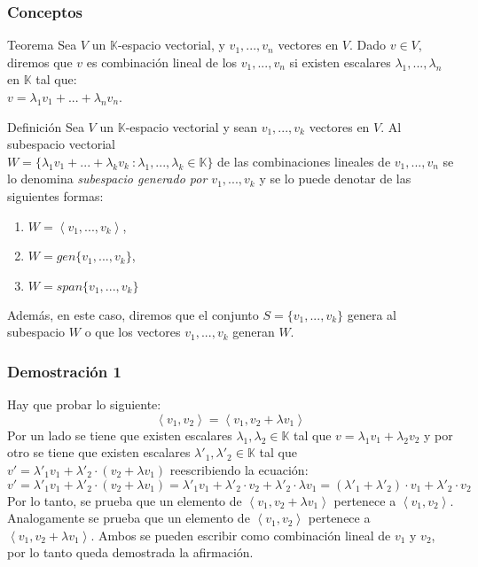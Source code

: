 \documentclass[a4paper,12pt]{article}
\begin{document}
\subsubsection{Conceptos}
\begin{teobox}{Teorema}
    Sea $V$ un $\mathds{K}$-espacio vectorial, y $v_1,...,v_n$ vectores en $V$. Dado $v\in V$, diremos que $v$ es combinación lineal de los $v_1,...,v_n$ si existen escalares $\lambda_1,...,\lambda_n$ en $\mathds{K}$ tal que: \\ $v=\lambda_1v_1+...+\lambda_nv_n$.
\end{teobox}
\begin{defbox}{Definición}
    Sea $V$ un $\mathds{K}$-espacio vectorial y sean $v_1,...,v_k$ vectores en $V$. Al subespacio vectorial \\ $W=\{ \lambda_1v_1+...+\lambda_kv_k \ : \lambda_1,...,\lambda_k \in \mathds{K} \}$ de las combinaciones lineales de $v_1,...,v_n$ se lo denomina \textit{subespacio generado por $v_1,...,v_k$} y se lo puede denotar de las siguientes formas:
    \begin{enumerate}
        \item $W = \left \langle v_1,...,v_k \right \rangle$,
        \item $W = gen\{ v_1,...,v_k \}$,
        \item $W = span\{ v_1,...,v_k\}$
    \end{enumerate}
    Además, en este caso, diremos que el conjunto $S = \{ v_1,...,v_k\}$ genera al
    subespacio $W$ o que los vectores $v_1,...,v_k$ generan $W$.
\end{defbox}

\subsubsection{Demostración 1}
Hay que probar lo siguiente:
$$
\left \langle v_1,v_2 \right \rangle =\left \langle v_1,v_2 + \lambda v_1 \right \rangle
$$
Por un lado se tiene que existen escalares $\lambda_1,\lambda_2\in\mathds{K}$ tal que $v=\lambda_1v_1+\lambda_2v_2$ y por otro se tiene que existen escalares $\lambda'_1,\lambda'_2\in\mathds{K}$ tal que $v'=\lambda'_1v_1+\lambda'_2\cdot(v_2 + \lambda v_1)$ reescribiendo la ecuación:
$$
v'=\lambda'_1v_1+\lambda'_2\cdot(v_2 + \lambda v_1) = \lambda'_1v_1+\lambda'_2\cdot v_2 + \lambda'_2\cdot\lambda v_1 = (\lambda'_1+\lambda'_2)\cdot v_1+\lambda'_2\cdot v_2
$$
Por lo tanto, se prueba que un elemento de $\left \langle v_1,v_2 + \lambda v_1 \right \rangle$ pertenece a $\left \langle v_1,v_2 \right \rangle$. Analogamente se prueba que un elemento de $\left \langle v_1,v_2 \right \rangle$ pertenece a $\left \langle v_1,v_2 + \lambda v_1 \right \rangle$.
\newline Ambos se pueden escribir como combinación lineal de $v_1$ y $v_2$, por lo tanto queda demostrada la afirmación.
\end{document}
